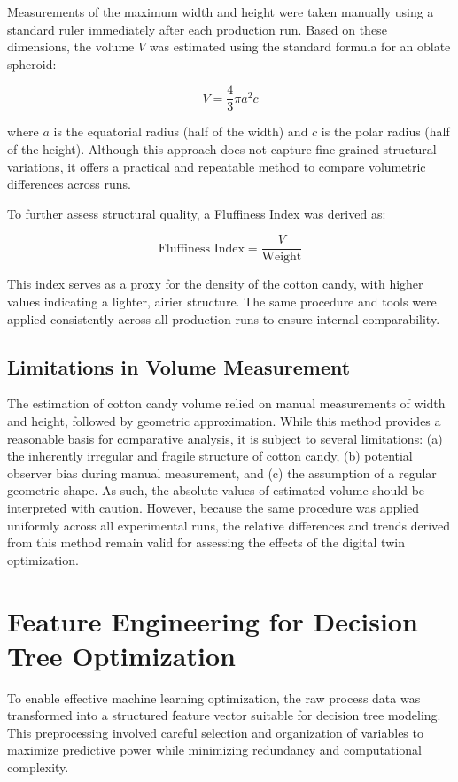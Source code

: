 Measurements of the maximum width and height were taken manually using a standard ruler immediately after each production run. Based on these dimensions, the volume \( V \) was estimated using the standard formula for an oblate spheroid:

\[
V = \frac{4}{3} \pi a^2 c
\]

where \( a \) is the equatorial radius (half of the width) and \( c \) is the polar radius (half of the height). Although this approach does not capture fine-grained structural variations, it offers a practical and repeatable method to compare volumetric differences across runs.

To further assess structural quality, a Fluffiness Index was derived as:

\[
\text{Fluffiness Index} = \frac{V}{\text{Weight}}
\]

This index serves as a proxy for the density of the cotton candy, with higher values indicating a lighter, airier structure. The same procedure and tools were applied consistently across all production runs to ensure internal comparability.

\subsection{Limitations in Volume Measurement}

The estimation of cotton candy volume relied on manual measurements of width and height, followed by geometric approximation. While this method provides a reasonable basis for comparative analysis, it is subject to several limitations: (a) the inherently irregular and fragile structure of cotton candy, (b) potential observer bias during manual measurement, and (c) the assumption of a regular geometric shape. As such, the absolute values of estimated volume should be interpreted with caution. However, because the same procedure was applied uniformly across all experimental runs, the relative differences and trends derived from this method remain valid for assessing the effects of the digital twin optimization.

\section{Feature Engineering for Decision Tree Optimization}
\label{sec:feature-engineering}

To enable effective machine learning optimization, the raw process data was transformed into a structured feature vector suitable for decision tree modeling. This preprocessing involved careful selection and organization of variables to maximize predictive power while minimizing redundancy and computational complexity.

